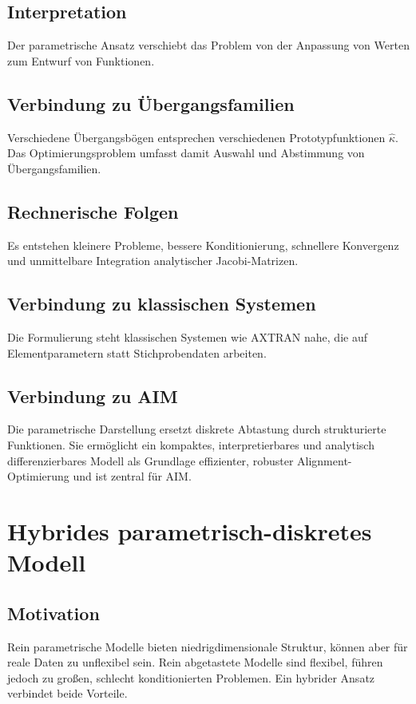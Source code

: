 \subsection{Interpretation}
Der parametrische Ansatz verschiebt das Problem von der Anpassung von Werten
zum Entwurf von Funktionen.

\subsection{Verbindung zu Übergangsfamilien}
Verschiedene Übergangsbögen entsprechen verschiedenen Prototypfunktionen
\(\widehat\kappa\). Das Optimierungsproblem umfasst damit Auswahl und
Abstimmung von Übergangsfamilien.

\subsection{Rechnerische Folgen}
Es entstehen kleinere Probleme, bessere Konditionierung, schnellere Konvergenz
und unmittelbare Integration analytischer Jacobi-Matrizen.

\subsection{Verbindung zu klassischen Systemen}
Die Formulierung steht klassischen Systemen wie AXTRAN nahe, die auf
Elementparametern statt Stichprobendaten arbeiten.

\subsection{Verbindung zu AIM}
\begin{summary}
Die parametrische Darstellung ersetzt diskrete Abtastung durch strukturierte
Funktionen. Sie ermöglicht ein kompaktes, interpretierbares und analytisch
differenzierbares Modell als Grundlage effizienter, robuster
Alignment-Optimierung und ist zentral für AIM.
\end{summary}

\section{Hybrides parametrisch-diskretes Modell}
\subsection{Motivation}
Rein parametrische Modelle bieten niedrigdimensionale Struktur, können aber
für reale Daten zu unflexibel sein. Rein abgetastete Modelle sind flexibel,
führen jedoch zu großen, schlecht konditionierten Problemen. Ein hybrider
Ansatz verbindet beide Vorteile.

